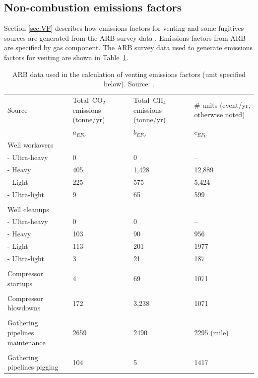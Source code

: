 \documentclass[11pt]{report}
\begin{document}
\subsection{Non-combustion emissions factors} \label{sec:VF_emissions_factors}

Section \ref{sec:VF} describes how emissions factors for venting and some fugitives sources are generated from the ARB survey data \cite{Lee2011}. Emissions factors from ARB are specified by gas component. The ARB survey data used to generate emissions factors for venting are shown in Table \,\ref{tab:ARB_venting_EF}.

\begin{table}
\begin{scriptsize}
\caption{ARB data used in the calculation of venting emissions factors (unit specified below). Source: \cite{Lee2011}.}
\label{tab:ARB_venting_EF}
\begin{threeparttable}
\begin{tabular*}{0.9\columnwidth}{p{}p{}p{}p{}}
\toprule
Source & Total\,\,\,CO$_{2}$ \quad \quad emissions (tonne/yr) & Total\,\,\,CH$_{4}$ \quad\quad\quad emissions \quad\quad\quad (tonne/yr) & \# units (event/yr, otherwise noted) \\
& $a_{EF_V}$ & $b_{EF_V}$ & $c_{EF_V}$\\
\midrule
Well workovers & & & \\
\quad - Ultra-heavy & 0 & 0 & -- \\
\quad - Heavy & 405 & 1,428 & 12,889 \\
\quad - Light & 225 & 575 & 5,424 \\
\quad - Ultra-light & 9 & 65 & 599 \\
\\
Well cleanups & & & \\
\quad - Ultra-heavy & 0 & 0 & -- \\
\quad - Heavy & 103 & 90 & 956 \\
\quad - Light & 113 & 201 & 1977 \\
\quad - Ultra-light & 3 & 21 & 187 \\
\\
Compressor startups & 4 & 69 & 1071 \\
\\
Compressor \quad\quad \quad blowdowns & 172 & 3,238 & 1071 \\
\\
Gathering\,\,pipelines maintenance & 2659 & 2490 & 2295 (mile) \\
\\
Gathering\,\,pipelines pigging & 104 & 5 & 1417 \\
\bottomrule
\end{tabular*}
\end{threeparttable}
\end{scriptsize}
\end{table}
\end{document}
